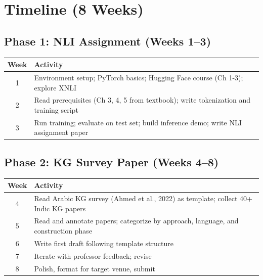 \section{Timeline (8 Weeks)}

\subsection{Phase 1: NLI Assignment (Weeks 1--3)}

\begin{table}[h]
\centering
\begin{tabularx}{\textwidth}{cX}
\toprule
\textbf{Week} & \textbf{Activity} \\
\midrule
1 & Environment setup; PyTorch basics; Hugging Face course (Ch 1-3); explore XNLI \\
2 & Read prerequisites (Ch 3, 4, 5 from textbook); write tokenization and training script \\
3 & Run training; evaluate on test set; build inference demo; write NLI assignment paper \\
\bottomrule
\end{tabularx}
\end{table}

\subsection{Phase 2: KG Survey Paper (Weeks 4--8)}

\begin{table}[h]
\centering
\begin{tabularx}{\textwidth}{cX}
\toprule
\textbf{Week} & \textbf{Activity} \\
\midrule
4 & Read Arabic KG survey (Ahmed et al., 2022) as template; collect 40+ Indic KG papers \\
5 & Read and annotate papers; categorize by approach, language, and construction phase \\
6 & Write first draft following template structure \\
7 & Iterate with professor feedback; revise \\
8 & Polish, format for target venue, submit \\
\bottomrule
\end{tabularx}
\end{table}
